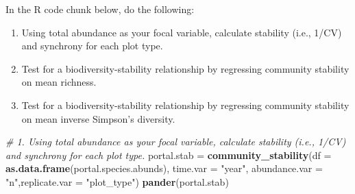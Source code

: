 \documentclass[]{article}
\newenvironment{Shaded}{\begin{snugshade}}{\end{snugshade}}
\newcommand{\KeywordTok}[1]{\textcolor[rgb]{0.13,0.29,0.53}{\textbf{{#1}}}}
\newcommand{\DataTypeTok}[1]{\textcolor[rgb]{0.13,0.29,0.53}{{#1}}}
\newcommand{\StringTok}[1]{\textcolor[rgb]{0.31,0.60,0.02}{{#1}}}
\newcommand{\CommentTok}[1]{\textcolor[rgb]{0.56,0.35,0.01}{\textit{{#1}}}}
\newcommand{\NormalTok}[1]{{#1}}
\providecommand{\tightlist}{%
  \setlength{\itemsep}{0pt}\setlength{\parskip}{0pt}}
\begin{document}
In the R code chunk below, do the following:

\begin{enumerate}
\def\labelenumi{\arabic{enumi}.}
\tightlist
\item
  Using total abundance as your focal variable, calculate stability
  (i.e., 1/CV) and synchrony for each plot type.
\item
  Test for a biodiversity-stability relationship by regressing community
  stability on mean richness.
\item
  Test for a biodiversity-stability relationship by regressing community
  stability on mean inverse Simpson's diversity.
\end{enumerate}

\begin{Shaded}
\begin{Highlighting}[]
\CommentTok{# 1. Using total abundance as your focal variable, calculate stability (i.e., 1/CV) and synchrony for each plot type.}
\NormalTok{portal.stab =}\StringTok{ }\KeywordTok{community_stability}\NormalTok{(}\DataTypeTok{df =} \KeywordTok{as.data.frame}\NormalTok{(portal.species.abunds), }\DataTypeTok{time.var =} \StringTok{"year"}\NormalTok{,}
\DataTypeTok{abundance.var =} \StringTok{"n"}\NormalTok{,}\DataTypeTok{replicate.var =} \StringTok{"plot_type"}\NormalTok{)}
\KeywordTok{pander}\NormalTok{(portal.stab)}
\end{Highlighting}
\end{Shaded}
\end{document}
